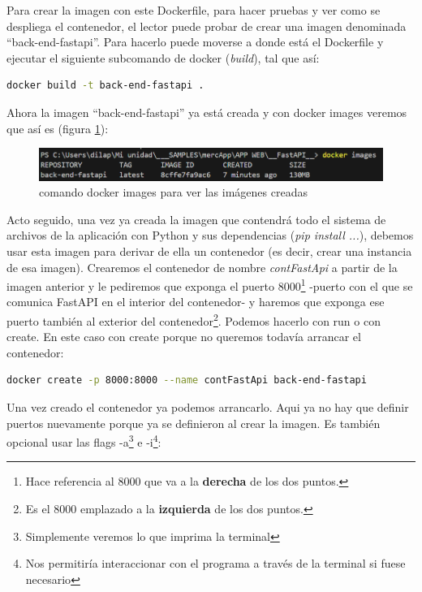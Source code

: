 \documentclass[a4paper,12pt]{report}
\begin{document}
	Para crear la imagen con este Dockerfile, para hacer pruebas y ver como se despliega el contenedor, el lector puede probar de crear una imagen denominada ``back-end-fastapi''. Para hacerlo puede moverse a donde está el Dockerfile y ejecutar el siguiente subcomando de docker (\textit{build}), tal que así:
	
	\begin{lstlisting}[language=bash]
		docker build -t back-end-fastapi .
	\end{lstlisting}
	
		Ahora la imagen ``back-end-fastapi'' ya está creada y con docker images veremos que así es (figura \ref{fig:dockerimages}):
	\FloatBarrier
	\begin{figure}[H]
		\centering
		\caption{comando docker images para ver las imágenes creadas}
		\label{fig:dockerimages}
		\includegraphics[width=1\linewidth]{img/dockerImages}
	\end{figure}
	\FloatBarrier
	

	
	Acto seguido, una vez ya creada la imagen que contendrá todo el sistema de archivos de la aplicación con Python y sus dependencias (\textit{pip install ...}), debemos usar esta imagen para derivar de ella un contenedor (es decir, crear una instancia de esa imagen). Crearemos el contenedor de nombre \textit{contFastApi} a partir de la imagen anterior y le pediremos que exponga el puerto 8000\footnote{Hace referencia al 8000 que va a la \textbf{derecha} de los dos puntos.} -puerto con el que se comunica FastAPI en el interior del contenedor- y haremos que exponga ese puerto también al exterior del contenedor\footnote{Es el 8000 emplazado a la \textbf{izquierda} de los dos puntos.}. Podemos hacerlo con run o con create. En este caso con create porque no queremos todavía arrancar el contenedor:
	
	\begin{lstlisting}[language=bash]
docker create -p 8000:8000 --name contFastApi back-end-fastapi
	\end{lstlisting}

	
	Una vez creado el contenedor ya podemos arrancarlo. Aqui ya no hay que definir puertos nuevamente porque ya se definieron al crear la imagen. Es también opcional usar las flags -a\footnote{Simplemente veremos lo que imprima la terminal} e -i\footnote{Nos permitiría interaccionar con el programa a través de la terminal si fuese necesario}:
	
\end{document}

